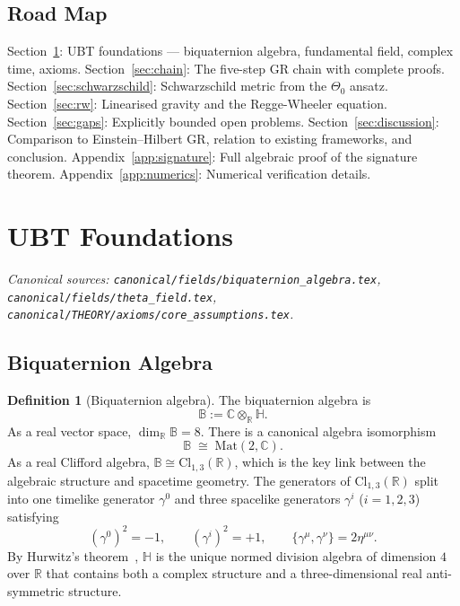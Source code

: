 \documentclass[12pt,a4paper]{article}
\theoremstyle{definition}
\newtheorem{definition}[theorem]{Definition}
\theoremstyle{remark}
\newcommand{\BB}{\mathbb{B}}
\newcommand{\CC}{\mathbb{C}}
\newcommand{\RR}{\mathbb{R}}
\newcommand{\HH}{\mathbb{H}}
\begin{document}
\subsection{Road Map}

Section~\ref{sec:foundations}: UBT foundations — biquaternion algebra,
fundamental field, complex time, axioms.
Section~\ref{sec:chain}: The five-step GR chain with complete proofs.
Section~\ref{sec:schwarzschild}: Schwarzschild metric from the $\Theta_0$ ansatz.
Section~\ref{sec:rw}: Linearised gravity and the Regge-Wheeler equation.
Section~\ref{sec:gaps}: Explicitly bounded open problems.
Section~\ref{sec:discussion}: Comparison to Einstein--Hilbert GR, relation
to existing frameworks, and conclusion.
Appendix~\ref{app:signature}: Full algebraic proof of the signature theorem.
Appendix~\ref{app:numerics}: Numerical verification details.

\section{UBT Foundations}
\label{sec:foundations}

\noindent\textit{Canonical sources: \texttt{canonical/fields/biquaternion\_algebra.tex},
\texttt{canonical/fields/theta\_field.tex},
\texttt{canonical/THEORY/axioms/core\_assumptions.tex}.}

\subsection{Biquaternion Algebra}

\begin{definition}[Biquaternion algebra]
\label{def:biquaternion}
The biquaternion algebra is
\[
  \BB := \CC\otimes_\RR\HH.
\]
As a real vector space, $\dim_\RR\BB = 8$.
There is a canonical algebra isomorphism
\[
  \BB \;\cong\; \mathrm{Mat}(2,\CC).
\]
As a real Clifford algebra,
$\BB \cong \mathrm{Cl}_{1,3}(\RR)$,
which is the key link between the algebraic structure and spacetime geometry.
The generators of $\mathrm{Cl}_{1,3}(\RR)$ split into one timelike generator
$\gamma^0$ and three spacelike generators $\gamma^i$ ($i = 1,2,3$) satisfying
\[
  (\gamma^0)^2 = -1, \qquad
  (\gamma^i)^2 = +1, \qquad
  \{\gamma^\mu, \gamma^\nu\} = 2\eta^{\mu\nu}.
\]
By Hurwitz's theorem~\cite{hurwitz1923}, $\HH$ is the unique normed division
algebra of dimension $4$ over $\RR$ that contains both a complex structure
and a three-dimensional real anti-symmetric structure.
\end{definition}
\end{document}
